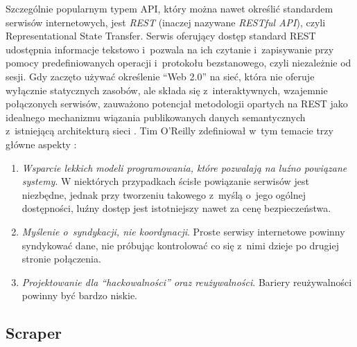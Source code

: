 Szczególnie popularnym typem API, który można nawet określić standardem serwisów internetowych, jest \emph{REST} (inaczej nazywane \emph{RESTful API}), czyli Representational State Transfer.
Serwis oferujący dostęp standard REST udostępnia informacje tekstowo i~pozwala na ich czytanie i~zapisywanie przy pomocy predefiniowanych operacji i~protokołu bezstanowego, czyli niezależnie od sesji.
Gdy zaczęto używać określenie ``Web 2.0'' na sieć, która nie oferuje wyłącznie statycznych zasobów, ale składa się z~interaktywnych, wzajemnie połączonych serwisów, zauważono potencjał metodologii opartych na REST jako idealnego mechanizmu wiązania publikowanych danych semantycznych z~istniejącą architekturą sieci \cite{battle2008bridging}.
Tim O'Reilly zdefiniował w~tym temacie trzy główne aspekty \cite{o2009web}:
\begin{enumerate}
	\item \emph{Wsparcie lekkich modeli programowania, które pozwalają na luźno powiązane systemy}.
	W niektórych przypadkach ścisłe powiązanie serwisów jest niezbędne, jednak przy tworzeniu takowego z~myślą o~jego ogólnej dostępności, luźny dostęp jest istotniejszy nawet za cenę bezpieczeństwa.
	\item \emph{Myślenie o~syndykacji\footnotemark, nie koordynacji}.
	Proste serwisy internetowe powinny syndykować dane, nie próbując kontrolować co się z~nimi dzieje po drugiej stronie połączenia.
	\item \emph{Projektowanie dla ``hackowalności'' oraz reużywalności}.
	Bariery reużywalności powinny być bardzo niskie.
\end{enumerate}

\subsection{Scraper}

